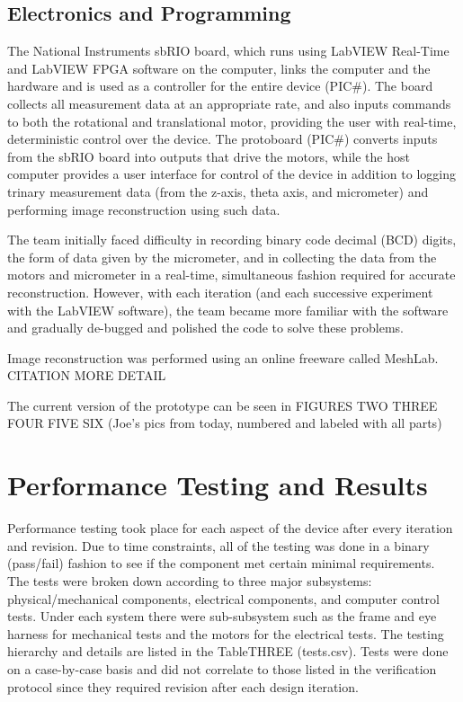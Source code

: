 \documentclass{article}
\begin{document}
\subsection{Electronics and Programming}
\label{sec:electronics}

The National Instruments sbRIO board, which runs using LabVIEW Real-Time and LabVIEW FPGA software on the computer, links the computer and the hardware and is used as a controller for the entire device (PIC#). The board collects all measurement data at an appropriate rate, and also inputs commands to both the rotational and translational motor, providing the user with real-time, deterministic control over the device. The protoboard (PIC#) converts inputs from the sbRIO board into outputs that drive the motors, while the host computer provides a user interface for control of the device in addition to logging trinary measurement data (from the z-axis, theta axis, and micrometer) and performing image reconstruction using such data. 

The team initially faced difficulty in recording binary code decimal (BCD) digits, the form of data given by the micrometer, and in collecting the data from the motors and micrometer in a real-time, simultaneous fashion required for accurate reconstruction. However, with each iteration (and each successive experiment with the LabVIEW software), the team became more familiar with the software and gradually de-bugged and polished the code to solve these problems. 

	Image reconstruction was performed using an online freeware called MeshLab. CITATION MORE DETAIL

The current version of the prototype can be seen in FIGURES  TWO THREE FOUR FIVE SIX (Joe’s pics from today, numbered and labeled with all parts)

\section{Performance Testing and Results}
\label{sec:perf-test-results}

Performance testing took place for each aspect of the device after every iteration and revision. Due to time constraints, all of the testing was done in a binary (pass/fail) fashion to see if the component met certain minimal requirements. The tests were broken down according to three major subsystems: physical/mechanical components, electrical components, and computer control tests. Under each system there were sub-subsystem such as the frame and eye harness for mechanical tests and the motors for the electrical tests. The testing hierarchy and details are listed in the TableTHREE (tests.csv). Tests were done on a case-by-case basis and did not correlate to those listed in the verification protocol since they required revision after each design iteration. 
	
\end{document}
